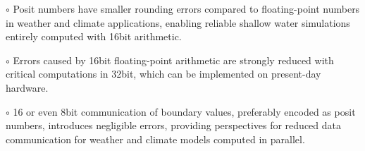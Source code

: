 \documentclass[draft]{agujournal2019}
\begin{document}





\begin{keypoints}
\item $\circ$ Posit numbers have smaller rounding errors compared to floating-point numbers in weather and climate applications, enabling reliable shallow water simulations entirely computed with 16bit arithmetic.

\item $\circ$ Errors caused by 16bit floating-point arithmetic are strongly reduced with critical computations in 32bit, which can be implemented on present-day hardware.

\item $\circ$ 16 or even 8bit communication of boundary values, preferably encoded as posit numbers, introduces negligible errors, providing perspectives for reduced data communication for weather and climate models computed in parallel.

\end{keypoints}

%
%

%
%
\end{document}
